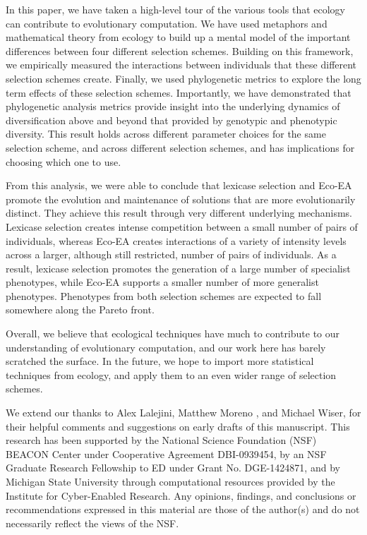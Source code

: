 In this paper, we have taken a high-level tour of the various tools that ecology can contribute to evolutionary computation. We have used metaphors and mathematical theory from ecology to build up a mental model of the important differences between four different selection schemes. Building on this framework, we empirically measured the interactions between individuals that these different selection schemes create. Finally, we used phylogenetic metrics to explore the long term effects of these selection schemes. Importantly, we have demonstrated that phylogenetic analysis metrics provide insight into the underlying dynamics of diversification above and beyond that provided by genotypic and phenotypic diversity. This result holds across different parameter choices for the same selection scheme, and across different selection schemes, and has implications for choosing which one to use.

From this analysis, we were able to conclude that lexicase selection and Eco-EA promote the evolution and maintenance of solutions that are more evolutionarily distinct. They achieve this result through very different underlying mechanisms. Lexicase selection creates intense competition between a small number of pairs of individuals, whereas Eco-EA creates interactions of a variety of intensity levels across a larger, although still restricted, number of pairs of individuals. As a result, lexicase selection promotes the generation of a large number of specialist phenotypes, while Eco-EA supports a smaller number of more generalist phenotypes. Phenotypes from both selection schemes are expected to fall somewhere along the Pareto front.

Overall, we believe that ecological techniques have much to contribute to our understanding of evolutionary computation, and our work here has barely scratched the surface. In the future, we hope to import more statistical techniques from ecology, and apply them to an even wider range of selection schemes.

\begin{acks}
We extend our thanks to Alex Lalejini, Matthew Moreno , and Michael Wiser, for their helpful comments and suggestions on early drafts of this manuscript. This research has been supported by the National Science Foundation (NSF) BEACON Center under Cooperative Agreement DBI-0939454, by an NSF Graduate Research Fellowship to ED under Grant No. DGE-1424871, and by Michigan State University through computational resources provided by the Institute for Cyber-Enabled Research. Any opinions, findings, and conclusions or recommendations expressed in this material are those of the author(s) and do not necessarily reflect the views of the NSF.
\end{acks}


